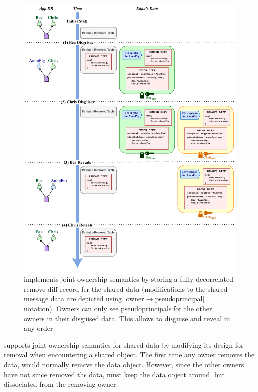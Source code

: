 \begin{figure}
    \centering
    \includegraphics[width=\textwidth]{figs/shared_data}
    \caption[\sys implements disguising of shared data using
    pseudoprincipals and diff records.]{\sys implements joint ownership
    semantics by storing a fully-decorrelated remove diff record for the shared data (modifications to the shared
    message data are depicted using 
    [owner$\to$pseudoprincipal] notation). Owners can only see
    pseudoprincipals for the other owners in their disguised data. This allows
    \sys to disguise and reveal in any order.}
\label{f:shared:data}
\end{figure}

\sys supports joint ownership semantics for shared data by modifying its design for
removal when encountering a shared object.
%
The first time any owner removes the data, \sys would normally remove the data
object. However, since the other owners have not since removed the data, \sys
must keep the data object around, but dissociated from the removing owner.
%

